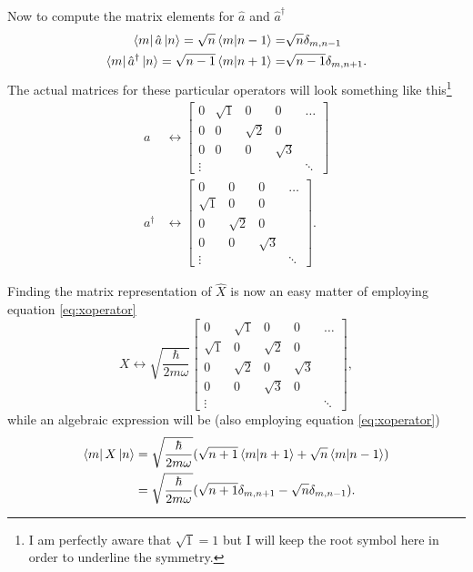 \documentclass{article}
\begin{document}
Now to compute the matrix elements for $\hat{a}$ and $\hat{a}^{\dagger}$
\begin{align}
\bra{m}\hat{a}\ket{n}=\sqrt{n}\braket{m}{n-1}=&\sqrt{n}\delta_{m,n-1} \\
\bra{m}\hat{a}^{\dagger}\ket{n}=\sqrt{n-1}\braket{m}{n+1}=&\sqrt{n-1}\delta_{m,n+1}.
\end{align}
The actual matrices for these particular operators will look something like this\footnote{I am perfectly aware that $\sqrt{1}=1$ but I will keep the root symbol here in order to underline the symmetry.}
\begin{align}
a &\leftrightarrow \begin{bmatrix}
0 & \sqrt{1} & 0 & 0 & \dots \\
0 & 0 & \sqrt{2} & 0 &  \\
0 & 0 & 0 & \sqrt{3} & \\
\vdots & & & & \ddots 
\end{bmatrix} \\
a^{\dagger} &\leftrightarrow \begin{bmatrix}
0 & 0 & 0 & \dots \\
\sqrt{1} & 0 & 0 & \\
0 & \sqrt{2} & 0 & \\
0 & 0 & \sqrt{3} & \\
\vdots & & & \ddots 
\end{bmatrix}.
\end{align}

Finding the matrix representation of $\hat{X}$ is now an easy matter of employing equation \ref{eq:xoperator}
\begin{equation}
\label{eq:xmatrixelements}
X \leftrightarrow  \sqrt{\frac{\hbar}{2m\omega}}\begin{bmatrix}
0 & \sqrt{1} & 0 & 0 & \dots \\
\sqrt{1} & 0 & \sqrt{2} & 0 &  \\
0 & \sqrt{2} & 0 & \sqrt{3} & \\
0 & 0 & \sqrt{3} & 0 \\
\vdots & & & & \ddots 
\end{bmatrix},
\end{equation}
while an algebraic expression will  be (also employing equation \ref{eq:xoperator})
\begin{align}
\bra{m}X\ket{n} &= \sqrt{\frac{\hbar}{2m\omega}}(\sqrt{n+1}\braket{m}{n+1}+\sqrt{n}\braket{m}{n-1}) \nonumber \\
&= \sqrt{\frac{\hbar}{2m\omega}}(\sqrt{n+1}\delta_{m,n+1}-\sqrt{n}\delta_{m,n-1}). \label{eq:xmatrixelements2}
\end{align}
\end{document}
